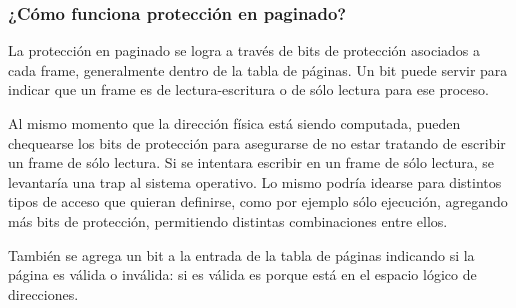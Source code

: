 \subsubsection{¿Cómo funciona protección en paginado?}
La protección en paginado se logra a través de bits de protección asociados a cada frame, generalmente dentro de la tabla de páginas. Un bit puede servir para indicar que un frame es de lectura-escritura o de sólo lectura para ese proceso.

Al mismo momento que la dirección física está siendo computada, pueden chequearse los bits de protección para asegurarse de no estar tratando de escribir un frame de sólo lectura. Si se intentara escribir en un frame de sólo lectura, se levantaría una trap al sistema operativo. Lo mismo podría idearse para distintos tipos de acceso que quieran definirse, como por ejemplo sólo ejecución, agregando más bits de protección, permitiendo distintas combinaciones entre ellos.

También se agrega un bit a la entrada de la tabla de páginas indicando si la página es válida o inválida: si es válida es porque está en el espacio lógico de direcciones.